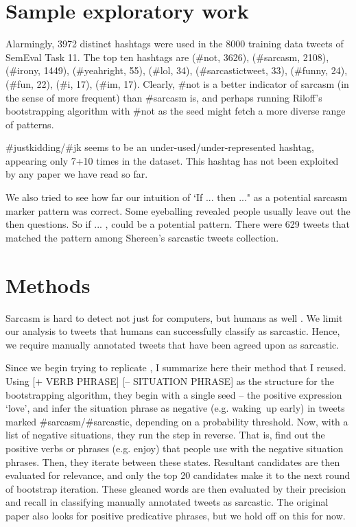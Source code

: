 \documentclass[11pt]{article}
\begin{document}
\section{Sample exploratory work}

Alarmingly, 3972 distinct hashtags were used in the 8000 training data tweets of SemEval Task 11. The top ten hashtags are (\#not, 3626), (\#sarcasm, 2108), (\#irony, 1449), (\#yeahright, 55), (\#lol, 34), (\#sarcastictweet, 33), (\#funny, 24), (\#fun, 22), (\#i, 17), (\#im, 17). Clearly, \#not is a better indicator of sarcasm (in the sense of more frequent) than \#sarcasm is, and perhaps running Riloff's bootstrapping algorithm with \#not as the seed might fetch a more diverse range of patterns.

\#justkidding/\#jk seems to be an under-used/under-represented hashtag, appearing only 7+10 times in the dataset. This hashtag has not been exploited by any paper we have read so far. 

We also tried to see how far our intuition of `If ... then ..." as a potential sarcasm marker pattern was correct. Some eyeballing revealed people usually leave out the then questions. So if ... , could be a potential pattern. There were 629 tweets that matched the pattern among Shereen's sarcastic tweets collection.

\section{Methods}

Sarcasm is hard to detect not just for computers, but humans as well \cite{gonzalez2011identifying}. We limit our analysis to tweets that humans can successfully classify as sarcastic. Hence, we require manually annotated tweets that have been agreed upon as sarcastic.

Since we begin trying to replicate \cite{riloff2013sarcasm} , I summarize here their method that I reused. Using [+ VERB PHRASE] [– SITUATION PHRASE] as the structure for the bootstrapping algorithm, they begin with a single seed – the positive expression `love', and infer the situation phrase as negative (e.g. waking up early) in tweets marked \#sarcasm/\#sarcastic, depending on a probability threshold. Now, with a list of negative situations, they run the step in reverse. That is, find out the positive verbs or phrases (e.g. enjoy) that people use with the negative situation phrases. Then, they iterate between these states. Resultant candidates are then evaluated for relevance, and only the top 20 candidates make it to the next round of bootstrap iteration. These gleaned words are then evaluated by their precision and recall in classifying manually annotated tweets as sarcastic. The original paper also looks for positive predicative phrases, but we hold off on this for now.
\end{document}
